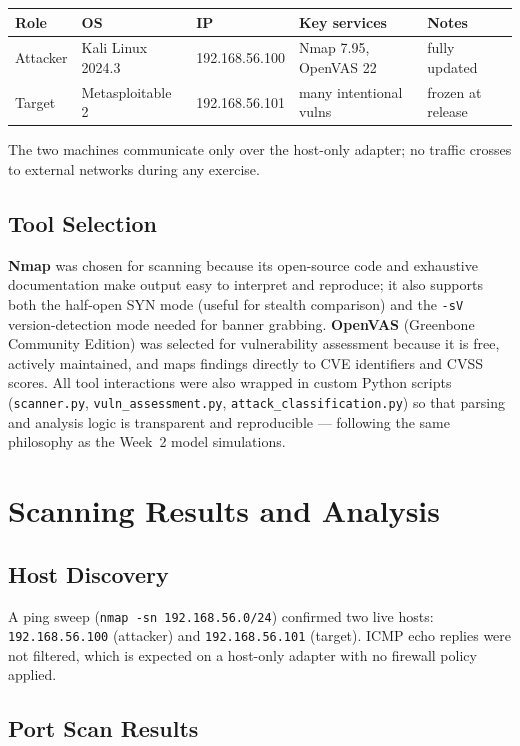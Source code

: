 \documentclass[11pt,a4paper]{article}
\begin{document}
\begin{center}
\small
\begin{tabular}{lllll}
\toprule
Role & OS & IP & Key services & Notes \\
\midrule
Attacker & Kali Linux 2024.3 & 192.168.56.100 & Nmap 7.95, OpenVAS 22 & fully updated \\
Target   & Metasploitable 2  & 192.168.56.101 & many intentional vulns & frozen at release \\
\bottomrule
\end{tabular}
\end{center}

The two machines communicate only over the host-only adapter; no traffic crosses to
external networks during any exercise.

\subsection{Tool Selection}
\textbf{Nmap} was chosen for scanning because its open-source code and exhaustive
documentation make output easy to interpret and reproduce; it also supports both the
half-open SYN mode (useful for stealth comparison) and the \texttt{-sV} version-detection
mode needed for banner grabbing.  \textbf{OpenVAS} (Greenbone Community Edition) was
selected for vulnerability assessment because it is free, actively maintained, and maps
findings directly to CVE identifiers and CVSS scores.  All tool interactions were also
wrapped in custom Python scripts (\texttt{scanner.py}, \texttt{vuln\_assessment.py},
\texttt{attack\_classification.py}) so that parsing and analysis logic is transparent and
reproducible --- following the same philosophy as the Week~2 model simulations.

\section{Scanning Results and Analysis}

\subsection{Host Discovery}
A ping sweep (\texttt{nmap -sn 192.168.56.0/24}) confirmed two live hosts:
\texttt{192.168.56.100} (attacker) and \texttt{192.168.56.101} (target).  ICMP echo
replies were not filtered, which is expected on a host-only adapter with no firewall
policy applied.

\subsection{Port Scan Results}
\end{document}
